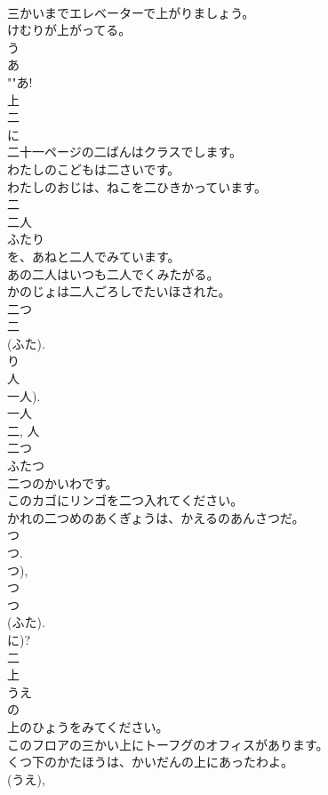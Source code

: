 \documentclass[8pt]{extreport}
\begin{document}
\begin{CJK}{UTF8}{min}
\\	三かいまでエレベーターで上がりましょう。	
\\	けむりが上がってる。	
\\	う 
\\	あ 
\\	""あ!
\\	上	
\\	二	
\\	に	
\\	二十一ページの二ばんはクラスでします。	
\\	わたしのこどもは二さいです。	
\\	わたしのおじは、ねこを二ひきかっています。	
\\	二	
\\	二人	
\\	ふたり	
\\	を、あねと二人でみています。	
\\	あの二人はいつも二人でくみたがる。	
\\	かのじょは二人ごろしでたいほされた。	
\\	二つ
\\	二 
\\	(ふた). 
\\	り 
\\	人 
\\	一人). 
\\	一人 
\\	二, 人	
\\	二つ	
\\	ふたつ	
\\	二つのかいわです。	
\\	このカゴにリンゴを二つ入れてください。	
\\	かれの二つめのあくぎょうは、かえるのあんさつだ。	
\\	つ 
\\	つ. 
\\	つ), 
\\	つ 
\\	つ 
\\	(ふた). 
\\	に)? 
\\	二	
\\	上	
\\	うえ	
\\	の 
\\	上のひょうをみてください。	
\\	このフロアの三かい上にトーフグのオフィスがあります。	
\\	くつ下のかたほうは、かいだんの上にあったわよ。	
\\	(うえ), 

\end{CJK}
\end{document}
